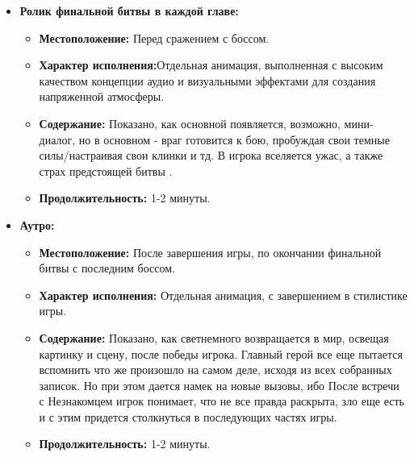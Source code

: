 \documentclass{article}
\begin{document}
\begin{itemize}
  \item \textbf{Ролик финальной битвы в каждой главе:} 
   \begin{itemize}
        \item \textbf{Местоположение:} Перед сражением с боссом.\par
        \item \textbf{Характер исполнения:}Отдельная анимация, выполненная с высоким качеством концепции аудио и визуальными эффектами для создания напряженной атмосферы.\par
        \item \textbf{Содержание:} Показано, как основной появляется, возможно, мини-диалог, но в основном - враг готовится к бою, пробуждая свои темные силы/настраивая свои клинки и тд. В игрока вселяется ужас, а также страх предстоящей битвы .\par
         \item \textbf{Продолжительность:} 1-2 минуты.\par
\end{itemize}  
\item \textbf{Аутро:} 
    \begin{itemize}
        \item \textbf{Местоположение:} После завершения игры, по окончании финальной битвы с последним боссом.\par
         \item \textbf{Характер исполнения:} Отдельная анимация, с завершением в стилистике игры.\par
        \item \textbf{Содержание:} Показано, как светнемного возвращается в мир, освещая картинку и сцену, после победы игрока. Главный герой все еще пытается вспомнить что же произошло на самом деле, исходя из всех собранных записок. Но при этом дается намек на новые вызовы, ибо После встречи с Незнакомцем игрок понимает, что не все правда раскрыта, зло еще есть и с этим придется столкнуться в последующих частях игры.\par
        \item \textbf{Продолжительность:} 1-2 минуты.\par
  
\end{itemize}  
\end{itemize}
\end{document}
